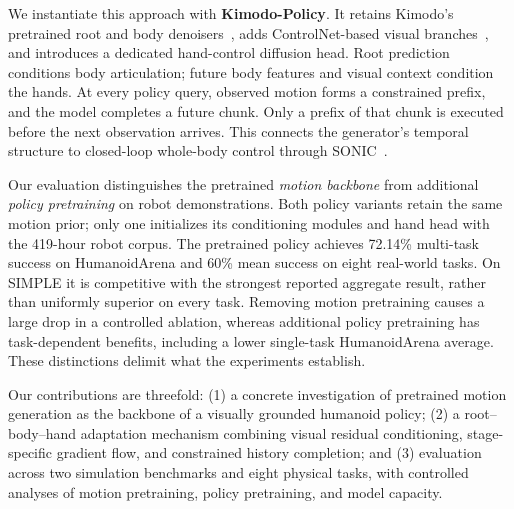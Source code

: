 We instantiate this approach with \textbf{Kimodo-Policy}. It retains Kimodo's pretrained root and body denoisers~\cite{kimodo}, adds ControlNet-based visual branches~\cite{zhang2023adding}, and introduces a dedicated hand-control diffusion head. Root prediction conditions body articulation; future body features and visual context condition the hands. At every policy query, observed motion forms a constrained prefix, and the model completes a future chunk. Only a prefix of that chunk is executed before the next observation arrives. This connects the generator's temporal structure to closed-loop whole-body control through SONIC~\cite{sonic}.

Our evaluation distinguishes the pretrained \emph{motion backbone} from additional \emph{policy pretraining} on robot demonstrations. Both policy variants retain the same motion prior; only one initializes its conditioning modules and hand head with the 419-hour robot corpus. The pretrained policy achieves 72.14\% multi-task success on HumanoidArena and 60\% mean success on eight real-world tasks. On SIMPLE it is competitive with the strongest reported aggregate result, rather than uniformly superior on every task. Removing motion pretraining causes a large drop in a controlled ablation, whereas additional policy pretraining has task-dependent benefits, including a lower single-task HumanoidArena average. These distinctions delimit what the experiments establish.

Our contributions are threefold: (1) a concrete investigation of pretrained motion generation as the backbone of a visually grounded humanoid policy; (2) a root--body--hand adaptation mechanism combining visual residual conditioning, stage-specific gradient flow, and constrained history completion; and (3) evaluation across two simulation benchmarks and eight physical tasks, with controlled analyses of motion pretraining, policy pretraining, and model capacity.
